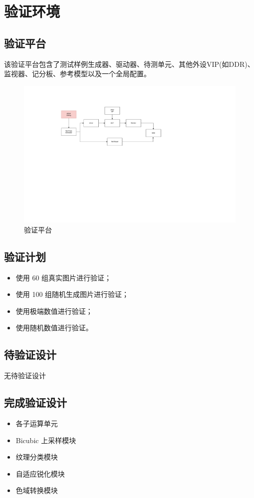 \documentclass[12pt, a4paper, oneside]{ctexbook}
\begin{document}
	
	\section{验证环境}
	\subsection{验证平台}
	该验证平台包含了测试样例生成器、驱动器、待测单元、其他外设VIP(如DDR)、监视器、记分板、参考模型以及一个全局配置。	
	\begin{figure}[h]
		\centering
		\includegraphics[scale=0.7]{pic/testbench}
		\caption{验证平台}
		\label{fig:testbench}
	\end{figure}
	
	\subsection{验证计划}
	\begin{itemize}
		\item 使用 60 组真实图片进行验证；
		\item 使用 100 组随机生成图片进行验证；
		\item 使用极端数值进行验证；
		\item 使用随机数值进行验证。
	\end{itemize}
	
	\subsection{待验证设计}
	无待验证设计
	
	\subsection{完成验证设计}
	\begin{itemize}
		\item 各子运算单元
		\item Bicubic 上采样模块
		\item 纹理分类模块
		\item 自适应锐化模块
		\item 色域转换模块
	\end{itemize}
\end{document}
